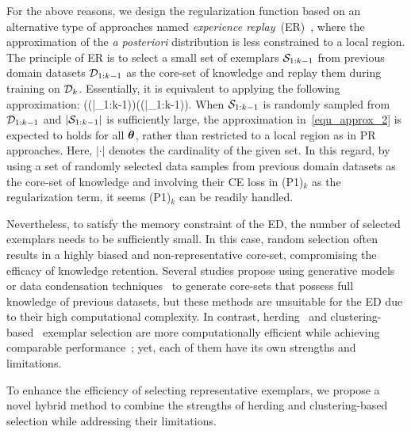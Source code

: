 For the above reasons, we design the regularization function based on an alternative type of approaches named \emph{experience replay}~(ER)~\cite{Chaudhry19ICML_Continual}, where the approximation of the \emph{a posteriori} distribution is less constrained to a local region.
The principle of ER is to select a small set of exemplars $\mathcal{S}_{1:k-1}$ from previous domain datasets $\mathcal{D}_{1:k-1}$ as the core-set of knowledge and replay them during training on $\mathcal{D}_k$.
Essentially, it is equivalent to applying the following approximation:
\beq
\label{equ_approx_2}
\log\!\big(\Pr(\btheta|\cD_{1:k-1})\big)\approx \log\!\big(\Pr(\btheta|\cS_{1:k-1})\big).
\eeq
When $\mathcal{S}_{1:k-1}$ is randomly sampled from $\mathcal{D}_{1:k-1}$ and $|\mathcal{S}_{1:k-1}|$ is sufficiently large, the approximation in~\eqref{equ_approx_2} is expected to holds for all $\bm\theta$, rather than restricted to a local region as in PR approaches. 
Here, $|\cdot|$ denotes the cardinality of the given set.
In this regard, by using a set of randomly selected data samples from previous domain datasets as the core-set of knowledge and involving their CE loss in (P1)$_k$ as the regularization term, it seems (P1)$_k$ can be readily handled.


Nevertheless, to satisfy the memory constraint of the ED, the number of selected exemplars needs to be sufficiently small. 
In this case, random selection often results in a highly biased and non-representative core-set, compromising the efficacy of knowledge retention.
Several studies propose using generative models~\cite{Shin17NIPS_Continual} or data condensation techniques~\cite{Liu20CVPR_Mnemonics} to generate core-sets that possess full knowledge of previous datasets, but these methods are unsuitable for the ED due to their high computational complexity.
In contrast, herding~\cite{Rebuffi17CVPR_iCaRL} and clustering-based~\cite{Nguyen18ICLR_VCL} exemplar selection are more computationally efficient while achieving comparable performance~\cite{Van22NatMI_Three}; yet, each of them have its own strengths and limitations.

To enhance the efficiency of selecting representative exemplars, we propose a novel hybrid method to combine the strengths of herding and clustering-based selection while addressing their limitations.

